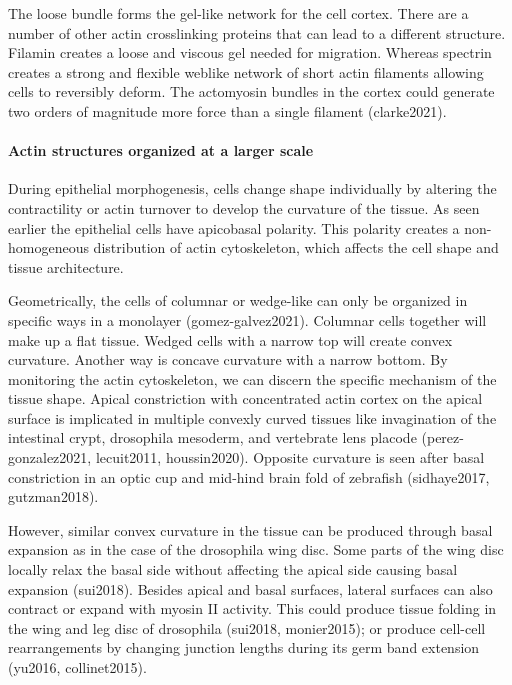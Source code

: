 \documentclass[
]{article}
\begin{document}
The loose bundle forms the gel-like network for the cell cortex. There
are a number of other actin crosslinking proteins that can lead to a
different structure. Filamin creates a loose and viscous gel needed for
migration. Whereas spectrin creates a strong and flexible weblike
network of short actin filaments allowing cells to reversibly deform.
The actomyosin bundles in the cortex could generate two orders of
magnitude more force than a single filament (clarke2021).

\hypertarget{actin-structures-organized-at-a-larger-scale}{%
\paragraph{Actin structures organized at a larger
scale}\label{actin-structures-organized-at-a-larger-scale}}

During epithelial morphogenesis, cells change shape individually by
altering the contractility or actin turnover to develop the curvature of
the tissue. As seen earlier the epithelial cells have apicobasal
polarity. This polarity creates a non-homogeneous distribution of actin
cytoskeleton, which affects the cell shape and tissue architecture.

Geometrically, the cells of columnar or wedge-like can only be organized
in specific ways in a monolayer (gomez-galvez2021). Columnar cells
together will make up a flat tissue. Wedged cells with a narrow top will
create convex curvature. Another way is concave curvature with a narrow
bottom. By monitoring the actin cytoskeleton, we can discern the
specific mechanism of the tissue shape. Apical constriction with
concentrated actin cortex on the apical surface is implicated in
multiple convexly curved tissues like invagination of the intestinal
crypt, drosophila mesoderm, and vertebrate lens placode
(perez-gonzalez2021, lecuit2011, houssin2020). Opposite curvature is
seen after basal constriction in an optic cup and mid-hind brain fold of
zebrafish (sidhaye2017, gutzman2018).

However, similar convex curvature in the tissue can be produced through
basal expansion as in the case of the drosophila wing disc. Some parts
of the wing disc locally relax the basal side without affecting the
apical side causing basal expansion (sui2018). Besides apical and basal
surfaces, lateral surfaces can also contract or expand with myosin II
activity. This could produce tissue folding in the wing and leg disc of
drosophila (sui2018, monier2015); or produce cell-cell rearrangements by
changing junction lengths during its germ band extension (yu2016,
collinet2015).
\end{document}

